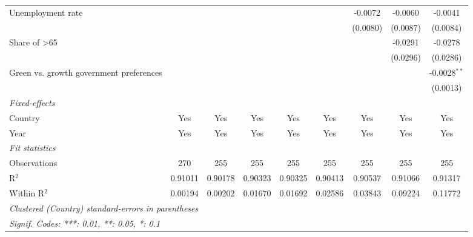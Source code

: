 \begin{table}[htbp]
\begin{tabular}{lcccccccc}
      Unemployment rate                                 &          &                       &          &          &          & -0.0072  & -0.0060  & -0.0041\\   
                                                        &          &                       &          &          &          & (0.0080) & (0.0087) & (0.0084)\\   
      Share of >65                                      &          &                       &          &          &          &          & -0.0291  & -0.0278\\   
                                                        &          &                       &          &          &          &          & (0.0296) & (0.0286)\\   
      Green vs. growth government preferences           &          &                       &          &          &          &          &          & -0.0028$^{**}$\\   
                                                        &          &                       &          &          &          &          &          & (0.0013)\\   
      \midrule
      \emph{Fixed-effects}\\
      Country                                           & Yes      & Yes                   & Yes      & Yes      & Yes      & Yes      & Yes      & Yes\\  
      Year                                              & Yes      & Yes                   & Yes      & Yes      & Yes      & Yes      & Yes      & Yes\\  
      \midrule
      \emph{Fit statistics}\\
      Observations                                      & 270      & 255                   & 255      & 255      & 255      & 255      & 255      & 255\\  
      R$^2$                                             & 0.91011  & 0.90178               & 0.90323  & 0.90325  & 0.90413  & 0.90537  & 0.91066  & 0.91317\\  
      Within R$^2$                                      & 0.00194  & 0.00202               & 0.01670  & 0.01692  & 0.02586  & 0.03843  & 0.09224  & 0.11772\\  
      \midrule \midrule
      \multicolumn{9}{l}{\emph{Clustered (Country) standard-errors in parentheses}}\\
      \multicolumn{9}{l}{\emph{Signif. Codes: ***: 0.01, **: 0.05, *: 0.1}}\\
   \end{tabular}
\end{table}


